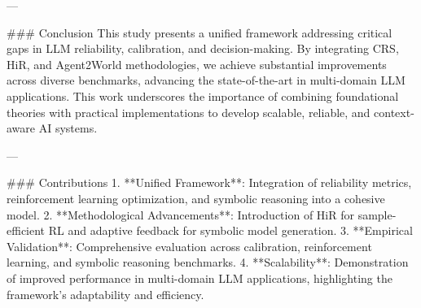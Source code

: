 ---

### Conclusion
This study presents a unified framework addressing critical gaps in LLM reliability, calibration, and decision-making. By integrating CRS, HiR, and Agent2World methodologies, we achieve substantial improvements across diverse benchmarks, advancing the state-of-the-art in multi-domain LLM applications. This work underscores the importance of combining foundational theories with practical implementations to develop scalable, reliable, and context-aware AI systems.

---

### Contributions
1. **Unified Framework**: Integration of reliability metrics, reinforcement learning optimization, and symbolic reasoning into a cohesive model.
2. **Methodological Advancements**: Introduction of HiR for sample-efficient RL and adaptive feedback for symbolic model generation.
3. **Empirical Validation**: Comprehensive evaluation across calibration, reinforcement learning, and symbolic reasoning benchmarks.
4. **Scalability**: Demonstration of improved performance in multi-domain LLM applications, highlighting the framework's adaptability and efficiency.